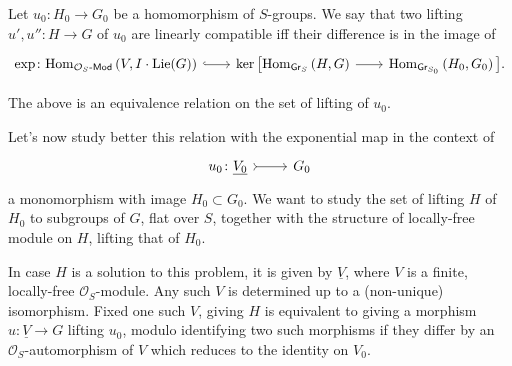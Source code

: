 \documentclass[../Main]{subfiles}
\begin{document}
\begin{defn}
	Let $u_0\colon H_0 \to G_0$ be a homomorphism of $S$-groups.
	We say that two lifting $u', u''\colon H \to G$ of $u_0$
	are linearly compatible iff their difference is in the image
	of 
	\begin{equation*}
	\begin{tikzcd}[row sep = 0ex, column sep = 2.0em
		,/tikz/column 1/.append style={anchor=base east}
		,/tikz/column 2/.append style={anchor=base west}]
		\exp\colon
		\mathrm{Hom}_{ \mathcal{O}_{ S }\text{-}\mathsf{Mod} }
		\left( V, I \cdot \mathrm{Lie}(G) \right)
		\arrow[r, "", hookrightarrow] &
		\ker \big[ 
		\mathrm{Hom}_{ \mathsf{Gr}_S } 
		\left( H, G \right)
		\arrow[r, "", rightarrow] &
		\mathrm{Hom}_{ \mathsf{Gr}_{S_0} }
		\left( H_0, G_0 \right)
		\big]
	.\end{tikzcd}
	\end{equation*} 
\end{defn}


\begin{rem}[]
	The above is an equivalence relation on the set of lifting of $u_0$.
\end{rem}


\noindent
Let's now study better this relation with the exponential map in the context of
\begin{equation*}
\begin{tikzcd}[row sep = 0ex
	,/tikz/column 1/.append style={anchor=base east}
	,/tikz/column 2/.append style={anchor=base west}]
	u_0\colon \underline{V_0} \arrow[r, "", rightarrowtail] &
	G_0
\end{tikzcd}
\end{equation*} 
a monomorphism with image $H_0 \subset G_0$.
We want to study the set of lifting $H$ of $H_0$ to
subgroups of $G$, flat over $S$, together with the structure
of locally-free module on $H$, lifting that of $H_0$.

\begin{rem}[]\label{rem:EquivalentLiftingSolutions}
	In case $H$ is a solution to this problem, it is given by
	$\underline{V}$, where $V$ is a finite, locally-free $\mathcal{O}_{ S }$-module.
	Any such $V$ is determined up to a (non-unique) isomorphism.
	Fixed one such $V$, giving $H$ is equivalent to giving a morphism
	$u\colon \underline{V} \to G$ lifting $u_0$, modulo identifying
	two such morphisms if they differ by an $\mathcal{O}_{ S }$-automorphism
	of $V$ which reduces to the identity on $V_0$.
\end{rem}
\end{document}
